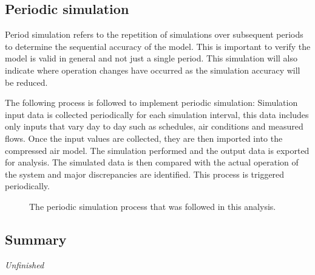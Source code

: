 	\subsection{Periodic simulation}	
		Period simulation refers to the repetition of simulations over subsequent periods to determine the sequential accuracy of the model.  This is important to verify the model is valid in general and not just a single period.  This simulation will also indicate where operation changes have occurred as the simulation accuracy will be reduced.
		\par 
		The following process is followed to implement periodic simulation: Simulation input data is collected periodically for each simulation interval, this data includes only inputs that vary day to day such as schedules, air conditions and  measured flows. Once the input values are collected, they are then imported into the compressed air model. The simulation performed and the output data is exported for analysis. The  simulated data is then compared with the actual operation of the system and major discrepancies are identified. This process is triggered periodically.
		\begin{figure}[h]
			\centering
			\caption{The periodic simulation process that was followed in this analysis.}
			\label{fig: PeriodicProcess}
		\end{figure}
	
	\subsection{Summary}
	\textit{Unfinished}
